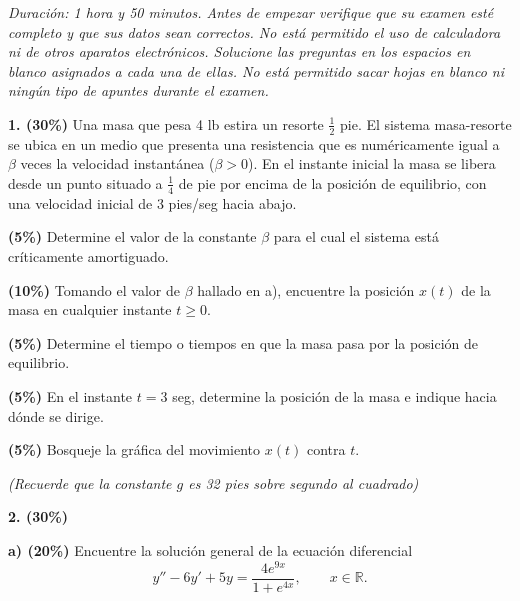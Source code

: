 \documentclass[11pt]{article}
\begin{document}
\examheader

\vspace{4pt}
\noindent\textit{Duración: 1 hora y 50 minutos. Antes de empezar verifique que su examen esté completo y que sus datos sean correctos. No está permitido el uso de calculadora ni de otros aparatos electrónicos. Solucione las preguntas en los espacios en blanco asignados a cada una de ellas. No está permitido sacar hojas en blanco ni ningún tipo de apuntes durante el examen.}

\vspace{6pt}
\noindent\textbf{1. (30\%)} Una masa que pesa 4 lb estira un resorte $\frac{1}{2}$ pie. El sistema masa-resorte se ubica en un medio que presenta una resistencia que es numéricamente igual a $\beta$ veces la velocidad instantánea ($\beta>0$). En el instante inicial la masa se libera desde un punto situado a $\frac{1}{4}$ de pie por encima de la posición de equilibrio, con una velocidad inicial de 3 pies/seg hacia abajo.

\begin{opciones}
\item[a.] \textbf{(5\%)} Determine el valor de la constante $\beta$ para el cual el sistema está críticamente amortiguado.
\item[b.] \textbf{(10\%)} Tomando el valor de $\beta$ hallado en a), encuentre la posición $x(t)$ de la masa en cualquier instante $t\geq 0$.
\item[c.] \textbf{(5\%)} Determine el tiempo o tiempos en que la masa pasa por la posición de equilibrio.
\item[d.] \textbf{(5\%)} En el instante $t=3$ seg, determine la posición de la masa e indique hacia dónde se dirige.
\item[e.] \textbf{(5\%)} Bosqueje la gráfica del movimiento $x(t)$ contra $t$.
\end{opciones}

\textit{(Recuerde que la constante $g$ es 32 pies sobre segundo al cuadrado)}

\vspace{6cm}

\newpage

\noindent\textbf{2. (30\%)}

\vspace{0.2cm}
\noindent\textbf{a) (20\%)} Encuentre la solución general de la ecuación diferencial
\[
y''-6y'+5y=\frac{4e^{9x}}{1+e^{4x}}, \qquad x\in\mathbb{R}.
\]

\vspace{6.5cm}
\end{document}
